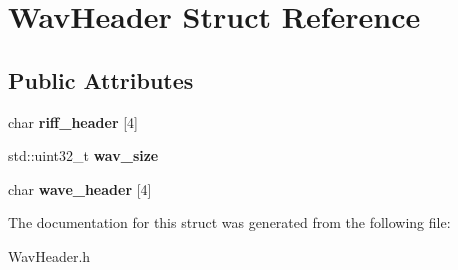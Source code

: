 \hypertarget{structWavHeader}{}\section{Wav\+Header Struct Reference}
\label{structWavHeader}
\subsection*{Public Attributes}
\begin{DoxyCompactItemize}
\item 
\mbox{\label{structWavHeader_a51def94c8bc0213e8eab1595878cc960}} 
char {\bfseries riff\+\_\+header} \mbox{[}4\mbox{]}
\item 
\mbox{\label{structWavHeader_a9cabe14f00b9aba73641a520934c22de}} 
std\+::uint32\+\_\+t {\bfseries wav\+\_\+size}
\item 
\mbox{\label{structWavHeader_aa91bc84d35c137d06a5d48bcc5d30988}} 
char {\bfseries wave\+\_\+header} \mbox{[}4\mbox{]}
\end{DoxyCompactItemize}


The documentation for this struct was generated from the following file\+:\begin{DoxyCompactItemize}
\item 
Wav\+Header.\+h\end{DoxyCompactItemize}
